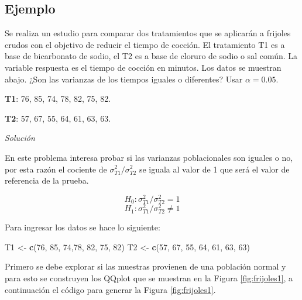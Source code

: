 \documentclass[10pt,]{krantz}
\makeatletter
\newenvironment{Shaded}{\begin{snugshade}}{\end{snugshade}}
\newcommand{\KeywordTok}[1]{\textcolor[rgb]{0.13,0.29,0.53}{\textbf{#1}}}
\newcommand{\DecValTok}[1]{\textcolor[rgb]{0.00,0.00,0.81}{#1}}
\newcommand{\StringTok}[1]{\textcolor[rgb]{0.31,0.60,0.02}{#1}}
\newcommand{\NormalTok}[1]{#1}
\newenvironment{kframe}{%
\medskip{}
\setlength{\fboxsep}{.8em}
 \def\at@end@of@kframe{}%
 \ifinner\ifhmode%
  \def\at@end@of@kframe{\end{minipage}}%
  \begin{minipage}{\columnwidth}%
 \fi\fi%
 \def\FrameCommand##1{\hskip\@totalleftmargin \hskip-\fboxsep
 \colorbox{shadecolor}{##1}\hskip-\fboxsep
     \hskip-\linewidth \hskip-\@totalleftmargin \hskip\columnwidth}%
 \MakeFramed {\advance\hsize-\width
   \@totalleftmargin\z@ \linewidth\hsize
   \@setminipage}}%
 {\par\unskip\endMakeFramed%
 \at@end@of@kframe}
\renewenvironment{Shaded}{\begin{kframe}}{\end{kframe}}
\makeatother
\begin{document}
\subsection*{Ejemplo}\label{ejemplo-69}


Se realiza un estudio para comparar dos tratamientos que se aplicarán a
frijoles crudos con el objetivo de reducir el tiempo de cocción. El
tratamiento T1 es a base de bicarbonato de sodio, el T2 es a base de
cloruro de sodio o sal común. La variable respuesta es el tiempo de
cocción en minutos. Los datos se muestran abajo. ¿Son las varianzas de
los tiempos iguales o diferentes? Usar \(\alpha=0.05\).

\textbf{T1}: 76, 85, 74, 78, 82, 75, 82.

\textbf{T2}: 57, 67, 55, 64, 61, 63, 63.

\emph{Solución}

En este problema interesa probar si las varianzas poblacionales son
iguales o no, por esta razón el cociente de
\(\sigma_{T1}^2 / \sigma_{T2}^2\) se iguala al valor de 1 que será el
valor de referencia de la prueba.

\[H_0: \sigma_{T1}^2 / \sigma_{T2}^2 = 1\]
\[H_1: \sigma_{T1}^2 / \sigma_{T2}^2 \neq 1\]

Para ingresar los datos se hace lo siguiente:

\begin{Shaded}
\begin{Highlighting}[]
\NormalTok{T1 <-}\StringTok{ }\KeywordTok{c}\NormalTok{(}\DecValTok{76}\NormalTok{, }\DecValTok{85}\NormalTok{, }\DecValTok{74}\NormalTok{,}\DecValTok{78}\NormalTok{, }\DecValTok{82}\NormalTok{, }\DecValTok{75}\NormalTok{, }\DecValTok{82}\NormalTok{) }
\NormalTok{T2 <-}\StringTok{ }\KeywordTok{c}\NormalTok{(}\DecValTok{57}\NormalTok{, }\DecValTok{67}\NormalTok{, }\DecValTok{55}\NormalTok{, }\DecValTok{64}\NormalTok{, }\DecValTok{61}\NormalTok{, }\DecValTok{63}\NormalTok{, }\DecValTok{63}\NormalTok{)}
\end{Highlighting}
\end{Shaded}

Primero se debe explorar si las muestras provienen de una población
normal y para esto se construyen los QQplot que se muestran en la Figura
\ref{fig:frijoles1}, a continuación el código para generar la Figura
\ref{fig:frijoles1}.
\end{document}
